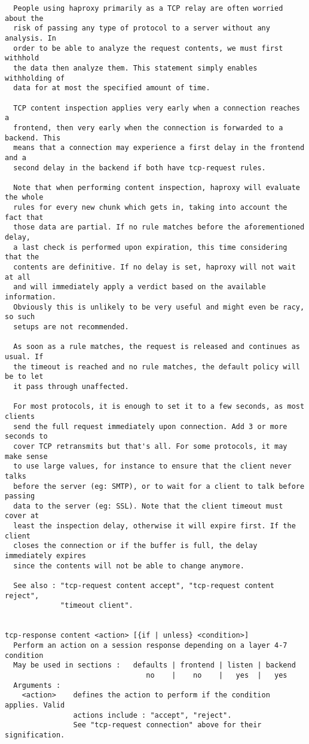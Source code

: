 \begin{verbatim}
  People using haproxy primarily as a TCP relay are often worried about the
  risk of passing any type of protocol to a server without any analysis. In
  order to be able to analyze the request contents, we must first withhold
  the data then analyze them. This statement simply enables withholding of
  data for at most the specified amount of time.

  TCP content inspection applies very early when a connection reaches a
  frontend, then very early when the connection is forwarded to a backend. This
  means that a connection may experience a first delay in the frontend and a
  second delay in the backend if both have tcp-request rules.

  Note that when performing content inspection, haproxy will evaluate the whole
  rules for every new chunk which gets in, taking into account the fact that
  those data are partial. If no rule matches before the aforementioned delay,
  a last check is performed upon expiration, this time considering that the
  contents are definitive. If no delay is set, haproxy will not wait at all
  and will immediately apply a verdict based on the available information.
  Obviously this is unlikely to be very useful and might even be racy, so such
  setups are not recommended.

  As soon as a rule matches, the request is released and continues as usual. If
  the timeout is reached and no rule matches, the default policy will be to let
  it pass through unaffected.

  For most protocols, it is enough to set it to a few seconds, as most clients
  send the full request immediately upon connection. Add 3 or more seconds to
  cover TCP retransmits but that's all. For some protocols, it may make sense
  to use large values, for instance to ensure that the client never talks
  before the server (eg: SMTP), or to wait for a client to talk before passing
  data to the server (eg: SSL). Note that the client timeout must cover at
  least the inspection delay, otherwise it will expire first. If the client
  closes the connection or if the buffer is full, the delay immediately expires
  since the contents will not be able to change anymore.

  See also : "tcp-request content accept", "tcp-request content reject",
             "timeout client".


tcp-response content <action> [{if | unless} <condition>]
  Perform an action on a session response depending on a layer 4-7 condition
  May be used in sections :   defaults | frontend | listen | backend
                                 no    |    no    |   yes  |   yes
  Arguments :
    <action>    defines the action to perform if the condition applies. Valid
                actions include : "accept", "reject".
                See "tcp-request connection" above for their signification.


\end{verbatim}
